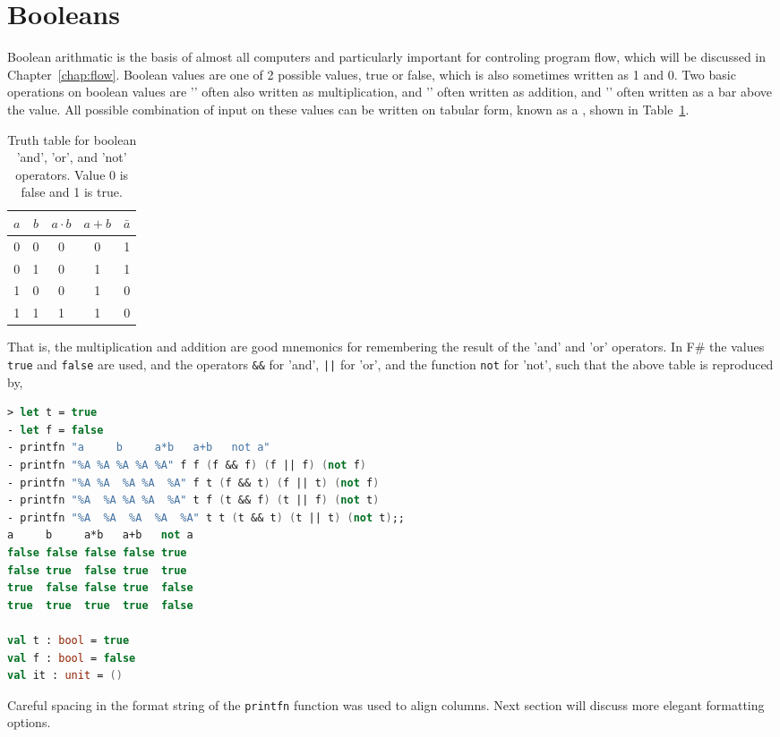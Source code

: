\section{Booleans}
Boolean arithmatic is the basis of almost all computers and particularly important for controling program flow, which will be discussed in Chapter~\ref{chap:flow}. Boolean values are one of 2 possible values, true or false, which is also sometimes written as 1 and 0. Two basic operations on boolean values are '' often also written as multiplication, and '' often written as addition, and '' often written as a bar above the value. All possible combination of input on these values can be written on tabular form, known as a , shown in Table~\ref{tab:truthTable}.
\begin{table}
  \centering
  \begin{tabular}{|c|c|c|c|c|}
    \hline
    $a$ & $b$ & $a\cdot b$& $a + b$&$\bar{a}$\\
    \hline
    0&0&0&0&1\\
    0&1&0&1&1\\
    1&0&0&1&0\\
    1&1&1&1&0\\
    \hline
  \end{tabular}
  \caption{Truth table for boolean 'and', 'or', and 'not' operators. Value 0 is false and 1 is true.}
  \label{tab:truthTable}
\end{table}
That is, the multiplication and addition are good mnemonics for remembering the result of the 'and' and 'or' operators. In F\# the values \lstinline|true| and \lstinline|false| are used, and the operators \lstinline|&&| for 'and', \lstinline+||+ for 'or', and the function \lstinline|not| for 'not', such that the above table is reproduced by,
\begin{lstlisting}[language=fsharp,caption={fsharpi}]
> let t = true
- let f = false
- printfn "a     b     a*b   a+b   not a"                                       
- printfn "%A %A %A %A %A" f f (f && f) (f || f) (not f)
- printfn "%A %A  %A %A  %A" f t (f && t) (f || t) (not f)
- printfn "%A  %A %A %A  %A" t f (t && f) (t || f) (not t)
- printfn "%A  %A  %A  %A  %A" t t (t && t) (t || t) (not t);;
a     b     a*b   a+b   not a
false false false false true
false true  false true  true
true  false false true  false
true  true  true  true  false

val t : bool = true
val f : bool = false
val it : unit = ()
\end{lstlisting}
Careful spacing in the format string of the \lstinline|printfn| function was used to align columns. Next section will discuss more elegant formatting options.

